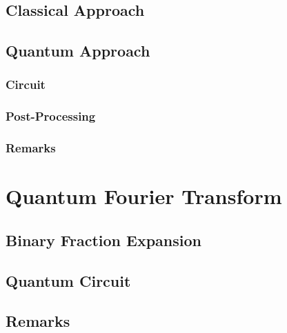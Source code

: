         \subsection{Classical Approach} %

        \subsection{Quantum Approach} %

            \subsubsection{Circuit} %

            \subsubsection{Post-Processing} %

            \subsubsection{Remarks} %

    \section{Quantum Fourier Transform} %

        \subsection{Binary Fraction Expansion} %

        \subsection{Quantum Circuit} %

        \subsection{Remarks} %

